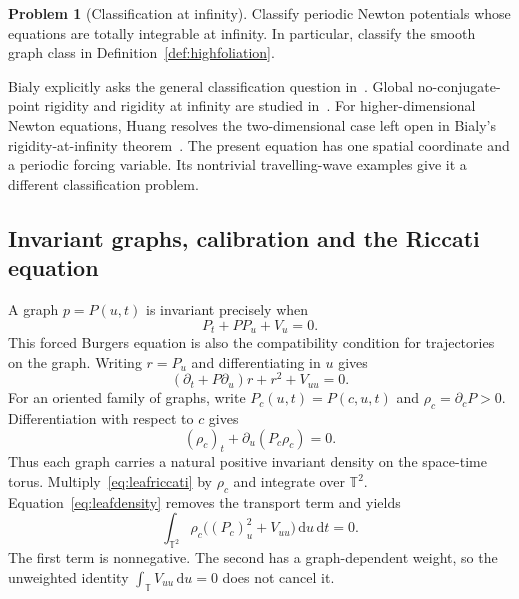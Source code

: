 \documentclass[review,12pt,times,a4paper,nopreprintline]{elsarticle}
\theoremstyle{plain}
\theoremstyle{definition}
\newtheorem{problem}[theorem]{Problem}
\theoremstyle{remark}
\newcommand{\T}{\mathbb T}
\newcommand{\dd}{\,\mathrm d}
\numberwithin{equation}{section}
\begin{document}
\begin{problem}[Classification at infinity]\label{prob:newton}
Classify periodic Newton potentials whose equations are totally integrable at infinity. In particular, classify the smooth graph class in Definition~\ref{def:highfoliation}.
\end{problem}

Bialy explicitly asks the general classification question in~\cite[Question 3 in his contribution]{OpenProblems2026}. Global no-conjugate-point rigidity and rigidity at infinity are studied in~\cite{BialyPolterovich,BialyInfinity}. For higher-dimensional Newton equations, Huang resolves the two-dimensional case left open in Bialy's rigidity-at-infinity theorem~\cite{Huang}. The present equation has one spatial coordinate and a periodic forcing variable. Its nontrivial travelling-wave examples give it a different classification problem.

\subsection{Invariant graphs, calibration and the Riccati equation}
A graph $p=P(u,t)$ is invariant precisely when
\begin{equation}\label{eq:burgers}
 P_t+PP_u+V_u=0.
\end{equation}
This forced Burgers equation is also the compatibility condition for trajectories on the graph. Writing $r=P_u$ and differentiating in $u$ gives
\begin{equation}\label{eq:leafriccati}
 (\partial_t+P\partial_u)r+r^2+V_{uu}=0.
\end{equation}
For an oriented family of graphs, write $P_c(u,t)=P(c,u,t)$ and $\rho_c=\partial_cP>0$. Differentiation with respect to $c$ gives
\begin{equation}\label{eq:leafdensity}
 (\rho_c)_t+\partial_u(P_c\rho_c)=0.
\end{equation}
Thus each graph carries a natural positive invariant density on the space-time torus. Multiply~\eqref{eq:leafriccati} by $\rho_c$ and integrate over $\T^2$. Equation~\eqref{eq:leafdensity} removes the transport term and yields
\begin{equation}\label{eq:weightedriccati}
 \int_{\T^2}\rho_c\bigl((P_c)_u^2+V_{uu}\bigr)\dd u\dd t=0.
\end{equation}
The first term is nonnegative. The second has a graph-dependent weight, so the unweighted identity $\int_{\T}V_{uu}\dd u=0$ does not cancel it.
\end{document}
